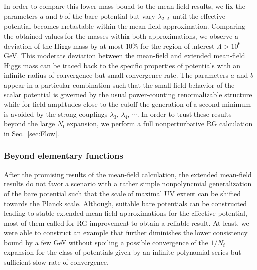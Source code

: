 \documentclass[twocolumn,aps,prd,showpacs,nofootinbib,superscriptaddress,preprintnumbers,floatfix,10pt]{revtex4-1}
\newcommand{\Nf}{N_{\mathrm{f}}}
\newcommand{\lL}{\lambda_{2,\Lambda}}
\begin{document}
In order to compare this lower mass bound to the mean-field results, we fix the parameters $a$ and $b$ of the bare potential but vary $\lL$ until the effective potential becomes metastable within the mean-field approximation. Comparing the obtained values for the masses within both approximations, we observe a deviation of the Higgs mass by at most $10\%$ for the region of interest $\Lambda > 10^{6}$ GeV. 
This moderate deviation between the mean-field and extended mean-field Higgs mass can be traced back to the specific properties of potentials with an infinite radius of convergence but small convergence rate. The parameters $a$ and $b$ appear in a particular combination such that the small field behavior of the scalar potential is governed by the usual power-counting renormalizable structure while for field amplitudes close to the cutoff the generation of a second minimum is avoided by the strong couplings $\lambda_{3}$, $\lambda_{4}$, $\cdots$. 
In order to trust these results beyond the large $\Nf$ expansion, we perform a full nonperturbative RG calculation in Sec.~\ref{sec:Flow}.






\subsubsection{Beyond elementary functions}

After the promising results of the mean-field calculation, the extended mean-field results do not favor a scenario with a rather simple nonpolynomial generalization of the bare potential such that the scale of maximal UV extent can be shifted towards the Planck scale. %
Although, suitable bare potentials can be constructed leading to stable extended mean-field approximations for the effective potential, most of them called for RG improvement to obtain a reliable result.
At least, we were able to construct an example that further diminishes the lower consistency bound by a few GeV without spoiling a possible convergence of the $1/\Nf$ expansion for the class of potentials given by an infinite polynomial series but sufficient slow rate of convergence. 
\end{document}
